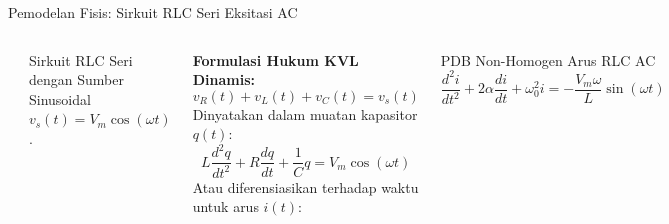 \documentclass[aspectratio=169,10pt]{beamer}
\begin{document}
\begin{frame}{Pemodelan Fisis: Sirkuit RLC Seri Eksitasi AC}
  \begin{columns}
    \begin{center}
    \end{center}
    \vspace{-0.2cm}
    \begin{center}
      \footnotesize Sirkuit RLC Seri dengan Sumber Sinusoidal $v_s(t) = V_m \cos(\omega t)$.
    \end{center}

    \textbf{Formulasi Hukum KVL Dinamis:}
    \begin{equation}
      v_R(t) + v_L(t) + v_C(t) = v_s(t)
    \end{equation}
    Dinyatakan dalam muatan kapasitor $q(t)$:
    \begin{equation}
      L \frac{d^2 q}{dt^2} + R \frac{dq}{dt} + \frac{1}{C} q = V_m \cos(\omega t)
    \end{equation}
    Atau diferensiasikan terhadap waktu untuk arus $i(t)$:
    \begin{block}{PDB Non-Homogen Arus RLC AC}
      \begin{equation*}
        \frac{d^2 i}{dt^2} + 2\alpha \frac{di}{dt} + \omega_0^2 i = -\frac{V_m \omega}{L} \sin(\omega t)
      \end{equation*}
    \end{block}
  \end{columns}
\end{frame}
\end{document}
